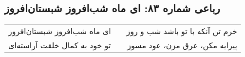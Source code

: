 \begin{center}
\section*{رباعی شماره ۸۳: ای ماه شب‌افروز شبستان‌افروز}
\label{sec:083}
\begin{longtable}{l p{0.5cm} r}
ای ماه شب‌افروز شبستان‌افروز
&&
خرم تن آنکه با تو باشد شب و روز
\\
تو خود به کمال خلقت آراسته‌ای
&&
پیرایه مکن، عرق مزن، عود مسوز
\\
\end{longtable}
\end{center}
